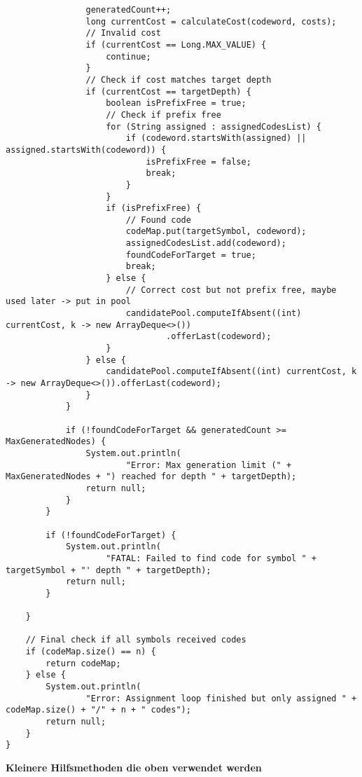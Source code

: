 \documentclass[a4paper,10pt,ngerman]{scrartcl}
\begin{document}
\begin{lstlisting}
                generatedCount++;
                long currentCost = calculateCost(codeword, costs);
                // Invalid cost
                if (currentCost == Long.MAX_VALUE) {
                    continue;
                }
                // Check if cost matches target depth
                if (currentCost == targetDepth) {
                    boolean isPrefixFree = true;
                    // Check if prefix free
                    for (String assigned : assignedCodesList) {
                        if (codeword.startsWith(assigned) || assigned.startsWith(codeword)) {
                            isPrefixFree = false;
                            break;
                        }
                    }
                    if (isPrefixFree) {
                        // Found code
                        codeMap.put(targetSymbol, codeword);
                        assignedCodesList.add(codeword);
                        foundCodeForTarget = true;
                        break;
                    } else {
                        // Correct cost but not prefix free, maybe used later -> put in pool
                        candidatePool.computeIfAbsent((int) currentCost, k -> new ArrayDeque<>())
                                .offerLast(codeword);
                    }
                } else {
                    candidatePool.computeIfAbsent((int) currentCost, k -> new ArrayDeque<>()).offerLast(codeword);
                }
            }

            if (!foundCodeForTarget && generatedCount >= MaxGeneratedNodes) {
                System.out.println(
                        "Error: Max generation limit (" + MaxGeneratedNodes + ") reached for depth " + targetDepth);
                return null;
            }
        }

        if (!foundCodeForTarget) {
            System.out.println(
                    "FATAL: Failed to find code for symbol " + targetSymbol + "' depth " + targetDepth);
            return null;
        }

    }

    // Final check if all symbols received codes
    if (codeMap.size() == n) {
        return codeMap;
    } else {
        System.out.println(
                "Error: Assignment loop finished but only assigned " + codeMap.size() + "/" + n + " codes");
        return null;
    }
}
\end{lstlisting}
\textbf{Kleinere Hilfsmethoden die oben verwendet werden}
\end{document}

